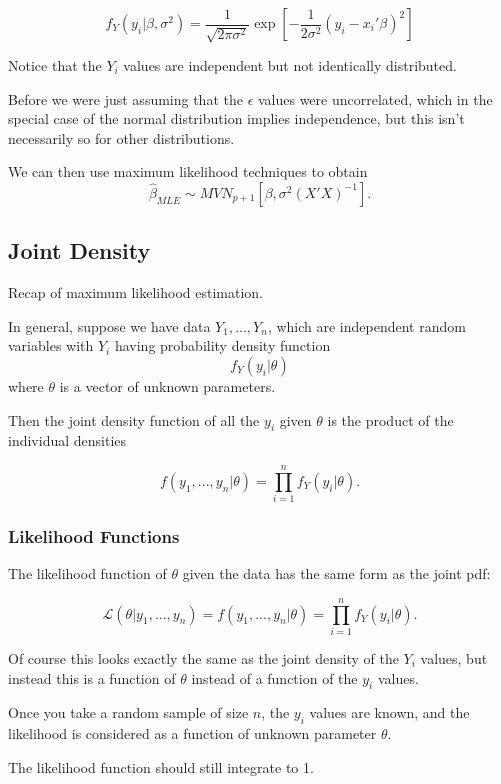 \documentclass[
  letterpaper,
  DIV=11,
  numbers=noendperiod]{scrreport}
\begin{document}
\[f_Y(y_i|\beta, \sigma^2) = \frac{1}{\sqrt{2\pi\sigma^2}} \exp\left[ -\frac{1}{2\sigma^2} (y_i - x_i'\beta)^2\right]\]

Notice that the \(Y_i\) values are independent but not identically
distributed.

Before we were just assuming that the \(\epsilon\) values were
uncorrelated, which in the special case of the normal distribution
implies independence, but this isn't necessarily so for other
distributions.

We can then use maximum likelihood techniques to obtain
\[\hat \beta_{MLE} \sim MVN_{p+1} \left[ \beta, \sigma^2 (X'X)^{-1} \right].\]

\hypertarget{joint-density}{%
\subsection{Joint Density}\label{joint-density}}

Recap of maximum likelihood estimation.

In general, suppose we have data \(Y_1, ..., Y_n\), which are
independent random variables with \(Y_i\) having probability density
function \[f_Y(y_i|\theta)\] where \(\theta\) is a vector of unknown
parameters.

Then the joint density function of all the \(y_i\) given \(\theta\) is
the product of the individual densities

\[f(y_1, ..., y_n|\theta) = \prod_{i=1}^n f_Y(y_i|\theta).\]

\hypertarget{likelihood-functions}{%
\subsubsection{Likelihood Functions}\label{likelihood-functions}}

The {likelihood function} of \(\theta\) given the data has the same form
as the joint pdf:

\[\mathcal L(\theta|y_1,...,y_n) = f(y_1, ..., y_n|\theta) = \prod_{i=1}^n f_Y(y_i|\theta).\]

Of course this looks exactly the same as the joint density of the
\(Y_i\) values, but instead this is a function of \(\theta\) instead of
a function of the \(y_i\) values.

Once you take a random sample of size \(n\), the \(y_i\) values are
known, and the likelihood is considered as a function of unknown
parameter \(\theta\).

The likelihood function should still integrate to 1.
\end{document}

